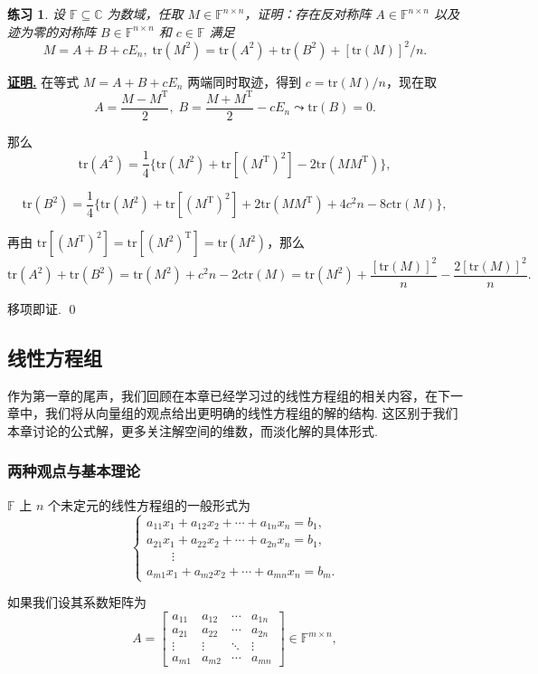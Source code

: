 \documentclass[10pt,openany]{article}
\theoremstyle{thmstyle} %
\newtheorem{practice}{练习}[section]
\theoremstyle{defstyle} %
\theoremstyle{prostyle} %
\theoremstyle{exastyle}
\theoremstyle{remstyle}
\renewenvironment{proof}[1][证明]{\par\underline{\textbf{#1.}} \;\fangsong}{\qed\par}
\newcommand{\T}{^{\text{T}}}
\newcommand{\F}{\mathbb{F}}
\newcommand{\C}{\mathbb{C}}
\newcommand{\n}{^{n \times n}}
\newcommand{\tr}{\mathrm{tr}}
\begin{document}
\begin{practice}
	设 \( \F \subseteq \C \) 为数域，任取 \( M \in \F\n \)，证明：存在反对称阵 \( A \in \F\n \) 以及迹为零的对称阵 \( B \in \F\n \) 和 \( c \in \F \) 满足
	\[ M=A+B+cE_n, \; \tr(M^2)=\tr(A^2)+\tr(B^2)+[\tr(M)]^2/n. \]
\end{practice}

\begin{proof}
	在等式 \( M=A+B+cE_n \) 两端同时取迹，得到 \( c=\tr(M)/n \)，现在取
	\[ A=\frac{M-M\T}{2}, \; B=\frac{M+M\T}{2}-cE_n \leadsto \tr(B)=0. \]
	
	那么 
	\[ \tr(A^2)= \frac{1}{4} \{ \tr(M^2)+\tr[(M\T)^2]-2\tr(MM\T) \}, \]
	
	\[ \tr(B^2)= \frac{1}{4} \{ \tr(M^2)+\tr[(M\T)^2]+2\tr(MM\T)+4c^2n-8c\tr(M) \}, \]
	
	再由 \( \tr[(M\T)^2]=\tr[(M^2)\T]=\tr(M^2) \)，那么
	\[ \tr(A^2)+\tr(B^2)= \tr(M^2)+c^2n-2c\tr(M)= \tr(M^2)+ \frac{[\tr(M)]^2}{n}-\frac{2[\tr(M)]^2}{n}. \]
	
	移项即证.
\end{proof}

\subsection{线性方程组}

作为第一章的尾声，我们回顾在本章已经学习过的线性方程组的相关内容，在下一章中，我们将从向量组的观点给出更明确的线性方程组的解的结构. 这区别于我们本章讨论的公式解，更多关注解空间的维数，而淡化解的具体形式. 

\subsubsection{两种观点与基本理论}

\( \F \) 上 \( n \) 个未定元的线性方程组的一般形式为
\begin{equation}
	\left\{\begin{array}{l}
		a_{11}x_1+a_{12}x_2+\cdots+a_{1n}x_n=b_1, \\
		a_{21}x_1+a_{22}x_2+\cdots+a_{2n}x_n=b_1, \\
		\qquad \vdots \\
		a_{m1}x_1+a_{m2}x_2+\cdots+a_{mn}x_n=b_m.
	\end{array}\right.
	\label{linequ.}
\end{equation}

如果我们设其系数矩阵为
\[ A=\begin{bmatrix}
	a_{11} & a_{12} & \cdots & a_{1n} \\
	a_{21} & a_{22} & \cdots & a_{2n} \\
	\vdots & \vdots & \ddots & \vdots \\
	a_{m1} & a_{m2} & \cdots & a_{mn}
\end{bmatrix} \in \F^{m \times n}, \]
\end{document}
